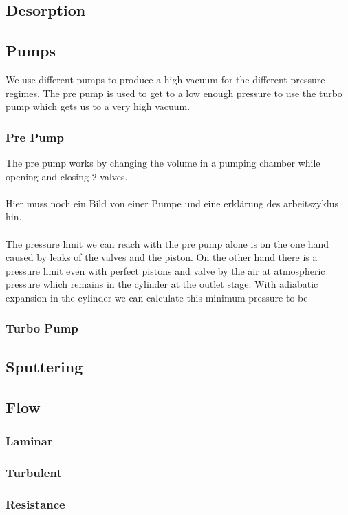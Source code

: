 \documentclass[]{article}
\begin{document}
\subsection{Desorption}
\subsection{Pumps}
We use different pumps to produce a high vacuum for the different pressure regimes. The pre pump is used to get to a low enough pressure to use the turbo pump which gets us to a very high vacuum.
\subsubsection{Pre Pump}
The pre pump works by changing the volume in a pumping chamber while opening and closing 2 valves.\\\\
Hier muss noch ein Bild von einer Pumpe und eine erklärung des arbeitszyklus hin.
\\\\
The pressure limit we can reach with the pre pump alone is on the one hand caused by leaks of the valves and the piston. On the other hand there is a pressure limit even with perfect pistons and valve by the air at atmospheric pressure which remains in the cylinder at the outlet stage. With adiabatic expansion in the cylinder we can calculate this minimum pressure to be
\[  \]
\subsubsection{Turbo Pump}
\subsection{Sputtering}

\subsection{Flow}
\subsubsection{Laminar}
\subsubsection{Turbulent}
\subsubsection{Resistance}
\end{document}
